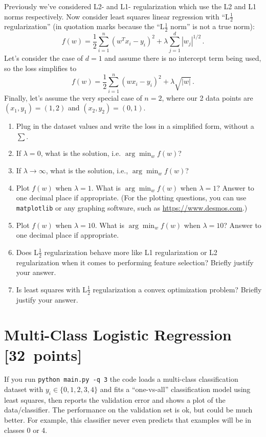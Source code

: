 \documentclass{article}
\newcommand{\blu}[1]{{\textcolor{blu}{#1}}}
\let\ask\blu
\newcommand\pts[1]{\textcolor{pointscolour}{[#1~points]}}
\begin{document}
Previously we've considered L2- and L1- regularization which use the L2 and L1 norms respectively. Now consider
least squares linear regression with ``L$\frac12$ regularization'' (in quotation marks because the ``L$\frac12$ norm'' is not a true norm):
\[
f(w) = \frac{1}{2} \sum_{i=1}^n (w^Tx_i - y_i)^2 + \lambda \sum_{j=1}^d |w_j|^{1/2} \, .
\]
Let's consider the case of $d=1$ and
assume there is no intercept term being used, so the loss simplifies to
\[
f(w) = \frac{1}{2} \sum_{i=1}^n (wx_i - y_i)^2 + \lambda \sqrt{|w|} \, .
\]
Finally, let's assume the very special case of $n=2$,
where our 2 data points are $(x_1,y_1)=(1,2)$ and $(x_2,y_2)=(0,1)$.

\begin{enumerate}
\item \ask{Plug in the dataset values and write the loss in a simplified form, without a $\sum$.}
\item \ask{If $\lambda=0$, what is the solution, i.e. $\arg \min_w f(w)$?}
\item \ask{If $\lambda\rightarrow \infty$, what is the solution, i.e., $\arg \min_w f(w)$?}
\item \ask{Plot $f(w)$ when $\lambda = 1$. What is $\arg \min_w f(w)$ when $\lambda=1$?} Answer to one decimal place if appropriate. (For the plotting questions, you can use \texttt{matplotlib} or any graphing software, such as \url{https://www.desmos.com}.)
\item \ask{Plot $f(w)$ when $\lambda = 10$. What is $\arg \min_w f(w)$ when $\lambda=10$?} Answer to one decimal place if appropriate.
\item \ask{Does L$\frac12$ regularization behave more like L1 regularization or L2 regularization
when it comes to performing feature selection?} Briefly justify your answer.
\item \ask{Is least squares with L$\frac12$ regularization
a convex optimization problem?} Briefly justify your answer.
\end{enumerate}




\clearpage
\section{Multi-Class Logistic Regression \pts{32}}

If you run \verb|python main.py -q 3| the code loads a multi-class
classification dataset with $y_i \in \{0,1,2,3,4\}$ and fits a ``one-vs-all'' classification
model using least squares, then reports the validation error and shows a plot of the data/classifier.
The performance on the validation set is ok, but could be much better.
For example, this classifier never even predicts that examples will be in classes 0 or 4.
\end{document}
